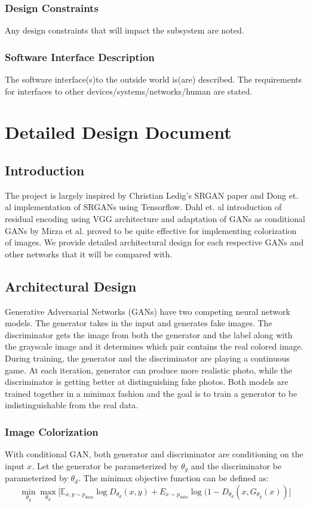 \documentclass[oneside,a4paper,12pt]{report}
\begin{document}
\begin{table}[!htbp]
 \subsection{Design Constraints}
Any design constraints that will impact the subsystem are noted.
 \subsection{Software Interface Description}
The software interface(s)to the outside world is(are) described.
The requirements for interfaces to other devices/systems/networks/human are stated.



\chapter{Detailed Design Document }
 \section{Introduction}
The project is largely inspired by Christian Ledig's SRGAN paper \cite{ledig2017photorealistic} and Dong et. al \cite{dong2014super} implementation of SRGANs using Tensorflow. Dahl et. al \cite{dahl2016automatic} introduction of residual encoding using VGG architecture and adaptation of GANs as conditional GANs by Mirza et al. \cite{mirza2014conditional} proved to be quite effective for implementing colorization of images. We provide detailed architectural design for each respective GANs and other networks that it will be compared with.
\section{Architectural Design}
	Generative Adversarial Networks (GANs) have two competing neural network models. The generator takes in the input and generates fake images. The discriminator gets the image from both the generator and the label along with the grayscale image and it determines which pair contains the real colored image. During training, the generator and the discriminator are playing a continuous game. At each iteration, generator can produce more realistic photo, while the discriminator is getting better at distinguishing fake photos. Both models are trained together in a minimax fashion and the goal is to train a generator to be indistinguishable from the real data.
	\subsection{Image Colorization}
	\hspace{0.4 in}With conditional GAN, both generator and discriminator are conditioning on the input $x$. Let the generator be parameterized by $\theta_g$ and the discriminator be parameterized by $\theta_d$. The minimax objective function can be defined as:
	\[
		\min_{\theta_g}\max_{\theta_d}\Big[\mathbb{E}_{x,y\sim p_{data}} \log D_{\theta_d}(x,y) + E_{x\sim p_{data}} \log(1 - D_{\theta_d}(x, G_{\theta_g}(x))\Big]
	\]


\end{table}
\end{document}
